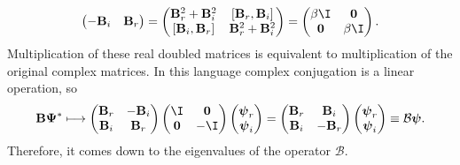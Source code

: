 \documentclass[11pt]{article}
\newcommand{\B}{\mathbf{B}}
\newcommand{\psib}{\boldsymbol{\psi}}
\newcommand{\Psib}{\boldsymbol{\Psi}}
\begin{document}
\begin{equation*}
\begin{gathered}
\begin{pmatrix}
           -\B_i & \B_r \\
         \end{pmatrix}
  =
         \begin{pmatrix}
           \B_r^2 + \B_i^2 & [\B_r, \B_i]    \\
           [\B_i, \B_r]    & \B_r^2 + \B_i^2 \\
         \end{pmatrix}
  =
         \begin{pmatrix}
           \beta \I   & \mathbf{0} \\
           \mathbf{0} & \beta \I   \\
         \end{pmatrix}
  .
\end{gathered}
\end{equation*}
%
Multiplication of these real doubled matrices is equivalent to multiplication of the original complex matrices.
In this language complex conjugation is a linear operation, so
%
\begin{equation}\label{eq:doublingtrick}
  \B \Psib^\ast \longmapsto
         \begin{pmatrix}
           \B_r & -\B_i \\
           \B_i &  \B_r \\
         \end{pmatrix}
         \begin{pmatrix}
           \I  & \mathbf{0} \\
           \mathbf{0} & -\I   \\
         \end{pmatrix}
         \begin{pmatrix}
           \psib_r \\
           \psib_i \\
         \end{pmatrix}
  =
         \begin{pmatrix}
           \B_r &  \B_i \\
           \B_i & -\B_r \\
         \end{pmatrix}
         \begin{pmatrix}
           \psib_r \\
           \psib_i \\
         \end{pmatrix}
  \equiv \mathcal{B} \psib.
\end{equation}
%
Therefore, it comes down to the eigenvalues of the operator \(\mathcal{B}\).
\end{document}
